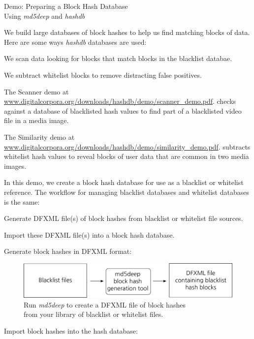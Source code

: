 \documentclass[12pt,twoside]{article}
\newcommand{\hdb}{\emph{hashdb}\xspace}
\newcommand{\mdd}{\emph{md5deep}\xspace}
\begin{document}
\begin{center}
\Large Demo: Preparing a Block Hash Database \\
\large Using \mdd and \hdb
\end{center}

We build large databases of block hashes
to help us find matching blocks of data.
Here are some ways \hdb databases are used:
\begin{compactitem}
\item We scan data looking for blocks that match blocks in the blacklist databae.
\item We subtract whitelist blocks to remove distracting false positives.
\end{compactitem}
The Scanner demo at
\url{www.digitalcorpora.org/downloads/hashdb/demo/scanner\_demo.pdf}.
checks against a database of blacklisted hash values
to find part of a blacklisted video file in a media image.

The Similarity demo at
\url{www.digitalcorpora.org/downloads/hashdb/demo/similarity\_demo.pdf}.
subtracts whitelist hash values
to reveal blocks of user data that are common in two media images.

In this demo, we create a block hash database
for use as a blacklist or whitelist reference.
The workflow for managing blacklist databases and whitelist databases
is the same:
\begin{compactenum}
\item Generate DFXML file(s) of block hashes
from blacklist or whitelist file sources.
\item Import these DFXML file(s) into a block hash database.
\end{compactenum}

Generate block hashes in DFXML format:

\begin{figure}[H]
  \center
  \includegraphics[scale=0.6]{drawings/md5deep}
  \caption*{Run \mdd to create a DFXML file of block hashes \\
            from your library of blacklist or whitelist files.}
\end{figure}

Import block hashes into the hash database:
\end{document}

